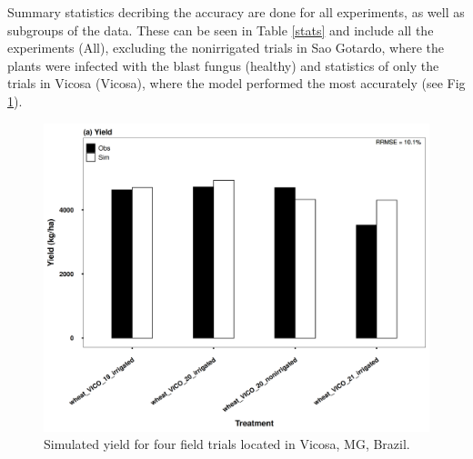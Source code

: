 \documentclass[11pt]{article}
\begin{document}
\begin{table}[H]
\centering
\caption{Model statistics}
\label{stats}
\end{table}

Summary statistics decribing the accuracy are done for all experiments, as well as subgroups of the data. These can be seen in Table \ref{stats} and include all the experiments (All), excluding the nonirrigated trials in Sao Gotardo, where the plants were infected with the blast fungus (healthy) and statistics of only the trials in Vicosa (Vicosa), where the model performed the most accurately (see Fig \ref{Vicosa}).

\begin{figure}[htbp]
\centering
\includegraphics[width=.9\linewidth]{../results/experimental-data/2023-02-18_Vico_only.png}
\caption{\label{Vicosa}Simulated yield for four field trials located in Vicosa, MG, Brazil.}
\end{figure}
\end{document}
